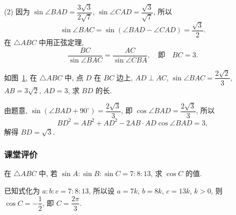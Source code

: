     (2) 因为 $\sin\angle BAD= \dfrac{3\sqrt3}{2\sqrt7}$, $\sin\angle CAD= \dfrac{\sqrt3}{\sqrt7}$, 所以
    \[\sin\angle BAC= \sin(\angle BAD- \angle CAD)
        = \dfrac{\sqrt3}2.\]
    在 $\triangle ABC$ 中用正弦定理, 
    \[\frac{BC}{\sin\angle BAC}= \dfrac{AC}{\sin\angle CBA},\quad
    \text{即}\quad BC= 3.\]
\endsolution

\begin{figure}[htb]
\small
\centering
\begin{minipage}[b]{0.45\linewidth}
    \centering
\caption{}\label{fig-180801-1920}
\end{minipage}
\hskip 0.5cm%
\begin{minipage}[b]{0.45\linewidth}
    \centering
\caption{}\label{fig-180801-1935}
\end{minipage}
\end{figure}
    
\lianxi
\begin{exercise}[s]
    如图~\ref{fig-180801-1935}, 在 $\triangle ABC$ 中, 点 $D$ 在 $BC$ 边上, $AD\perp AC$, $\sin \angle BAC= \dfrac{2\sqrt2}3$, $AB=3\sqrt2$, $AD=3$, 求 $BD$ 的长.
\end{exercise}
\beginsolution
    由题意, $\sin(\angle BAD+ 90^\circ)= \dfrac{2\sqrt3}3$, 即 $\cos\angle BAD= \dfrac{2\sqrt3}3$, 所以
    \[BD^2= AB^2+AD^2- 2AB\cdot AD\cos\angle BAD= 3,\]
    解得 $BD=\sqrt3$.
\endsolution

\subsubsection{课堂评价}
\begin{exercise}
    在 $\triangle ABC$ 中, 若 $\sin A:\sin B:\sin C=7:8:13$, 求 $\cos C$ 的值.
\end{exercise}
\beginsolution
    已知式化为 $a:b:c= 7:8:13$, 所以设 $a=7k$, $b=8k$, $c=13k$, $k>0$, 则 $\cos C= -\dfrac12$, 即 $C= \dfrac{2\pi}3$.
\endsolution

